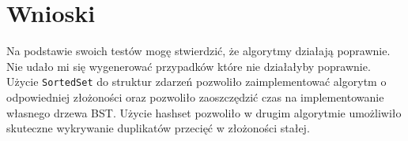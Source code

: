\documentclass[a4paper]{article}
\begin{document}
\section{Wnioski}
Na podstawie swoich testów mogę stwierdzić, że algorytmy działają poprawnie. Nie udało mi się wygenerować 
przypadków które nie działałyby poprawnie. Użycie \verb|SortedSet| do struktur zdarzeń pozwoliło 
zaimplementować algorytm o odpowiedniej złożoności oraz pozwoliło zaoszczędzić czas na implementowanie
własnego drzewa BST. Użycie hashset pozwoliło w drugim algorytmie umożliwiło skuteczne wykrywanie
duplikatów przecięć w złożoności stałej.
\end{document}
